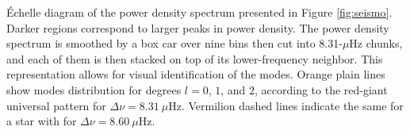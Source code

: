 \label{fig:echelle} \'Echelle diagram of the power density spectrum presented in Figure \ref{fig:seismo}. Darker regions correspond to larger peaks in power density. The power density spectrum is smoothed by a box car over nine bins then cut into 8.31-$\mu$Hz chunks, and each of them is then stacked on top of its lower-frequency neighbor. This representation allows for visual identification of the modes. Orange plain lines show modes distribution for degrees $l = 0$, $1$, and $2$, according to the red-giant universal pattern for $\Delta\nu = 8.31\ \mu$Hz. Vermilion dashed lines indicate the same for a star with for $\Delta\nu = 8.60\ \mu$Hz.
  
  
  